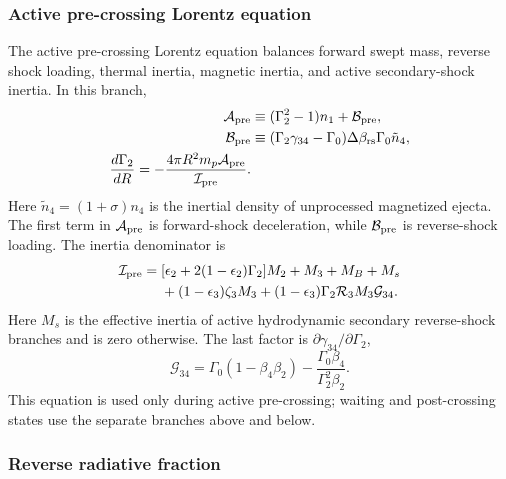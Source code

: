 \documentclass[twocolumn]{aastex702}
\begin{document}
\subsubsection{Active pre-crossing Lorentz equation}

The active pre-crossing Lorentz equation balances forward swept mass, reverse
shock loading, thermal inertia, magnetic inertia, and active secondary-shock
inertia.  In this branch,
\begin{equation}
\begin{aligned}
\mathcal A_{\rm pre}
&\equiv(\Gamma_2^2-1)n_1+\mathcal B_{\rm pre},\\
\mathcal B_{\rm pre}
&\equiv(\Gamma_2\gamma_{34}-\Gamma_0)\Delta\beta_{\rm rs}
\Gamma_0\tilde n_4,\\
\frac{d\Gamma_2}{dR}
=-\frac{4\pi R^2m_p\mathcal A_{\rm pre}}{\mathcal I_{\rm pre}}.
\end{aligned}
\end{equation}
Here \(\tilde n_4=(1+\sigma)n_4\) is the inertial density of unprocessed
magnetized ejecta.  The first term in \(\mathcal A_{\rm pre}\) is forward-shock
deceleration, while \(\mathcal B_{\rm pre}\) is reverse-shock loading.  The
inertia denominator is
\begin{equation}
\begin{split}
\mathcal I_{\rm pre}={}&
[\epsilon_2+2(1-\epsilon_2)\Gamma_2]M_2
+M_3+M_B+M_s \\
& +(1-\epsilon_3)\zeta_3M_3
+(1-\epsilon_3)\Gamma_2\mathcal R_3M_3\mathcal G_{34}.
\end{split}
\end{equation}
Here \(M_s\) is the effective inertia of active hydrodynamic secondary
reverse-shock branches and is zero otherwise.  The last factor is
\(\partial\gamma_{34}/\partial\Gamma_2\),
\begin{equation}
\mathcal G_{34}=
\Gamma_0(1-\beta_4\beta_2)
-\frac{\Gamma_0\beta_4}{\Gamma_2^2\beta_2}.
\end{equation}
This equation is used only during active pre-crossing; waiting and post-crossing
states use the separate branches above and below.

\subsubsection{Reverse radiative fraction}
\end{document}

